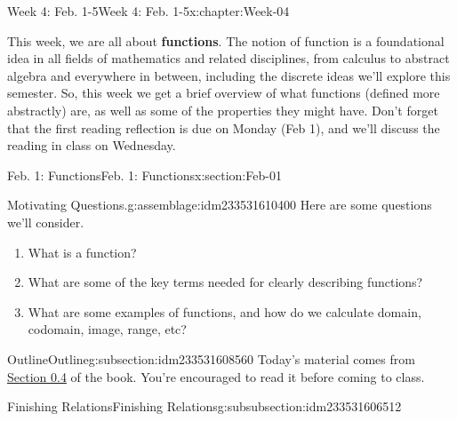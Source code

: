 \documentclass[oneside,10pt,]{book}
\newcommand{\terminology}[1]{\textbf{#1}}
\numberwithin{equation}{section}
\begin{document}
\begin{chapterptx}{Week 4: Feb. 1-5}{}{Week 4: Feb. 1-5}{}{}{x:chapter:Week-04}
\begin{introduction}{}%
This week, we are all about \terminology{functions}. The notion of function is a foundational idea in all fields of mathematics and related disciplines, from calculus to abstract algebra and everywhere in between, including the discrete ideas we'll explore this semester. So, this week we get a brief overview of what functions (defined more abstractly) are, as well as some of the properties they might have. Don't forget that the first reading reflection is due on Monday (Feb 1), and we'll discuss the reading in class on Wednesday.%
\end{introduction}%
%
%
\typeout{************************************************}
\typeout{************************************************}
%
\begin{sectionptx}{Feb. 1: Functions}{}{Feb. 1: Functions}{}{}{x:section:Feb-01}
\begin{introduction}{}%
\begin{assemblage}{Motivating Questions.}{g:assemblage:idm233531610400}%
Here are some questions we'll consider. %
\begin{enumerate}
\item{}What is a function?%
\item{}What are some of the key terms needed for clearly describing functions?%
\item{}What are some examples of functions, and how do we calculate domain, codomain, image, range, etc?%
\end{enumerate}
%
\end{assemblage}
\end{introduction}%
%
%
\typeout{************************************************}
\typeout{************************************************}
%
\begin{subsectionptx}{Outline}{}{Outline}{}{}{g:subsection:idm233531608560}
Today's material comes from \href{http://discrete.openmathbooks.org/dmoi3/sec_intro-functions.html}{Section 0.4} of the book. You're encouraged to read it before coming to class.%
%
%
\typeout{************************************************}
\typeout{************************************************}
%
\begin{subsubsectionptx}{Finishing Relations}{}{Finishing Relations}{}{}{g:subsubsection:idm233531606512}

\end{subsubsectionptx}
\end{subsectionptx}
\end{sectionptx}
\end{chapterptx}
\end{document}
